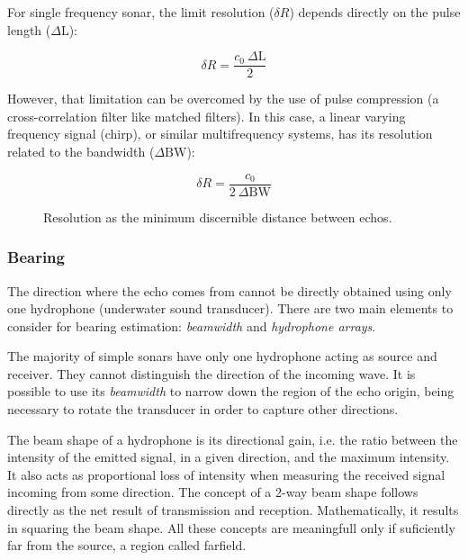 For single frequency sonar, the limit resolution ($\delta R$) depends directly
on the pulse length ($\Delta\text{L}$):

\[ \delta R = \frac{c_0~\Delta\text{L}}{2} \] 

However, that limitation can be overcomed by the use of pulse compression (a
cross-correlation filter like matched filters). In this case, a linear varying
frequency signal (chirp), or similar multifrequency systems, has its resolution
related to the bandwidth ($\Delta \text{BW}$):

\[ \delta R = \frac{c_0}{2~\Delta \text{BW}} \]

\begin{figure}
	\centering
	
	\caption{Resolution as the minimum discernible distance between echos.}
	\label{fig:chirpresolution}
\end{figure}


\subsubsection{Bearing}
\label{sss:bearing}

The direction where the echo comes from cannot be directly obtained using
only one hydrophone (underwater sound transducer). There are two main elements
to consider for bearing estimation: \textit{beamwidth} and \textit{hydrophone
arrays}.

The majority of simple sonars have only one hydrophone acting as source and
receiver. They cannot distinguish the direction of the incoming wave. It is
possible to use its \textit{beamwidth} to narrow down the region of the echo
origin, being necessary to rotate the transducer in order to capture
other directions.

The beam shape of a hydrophone is its directional gain, i.e. the ratio between
the intensity of the emitted signal, in a given direction, and the maximum
intensity. It also acts as proportional loss of intensity when measuring the
received signal incoming from some direction. The concept of a 2-way beam
shape follows directly as the net result of transmission and reception.
Mathematically, it results in squaring the beam shape. All these concepts are
meaningfull only if suficiently far from the source, a region called
farfield\cite{beamwidth}.

